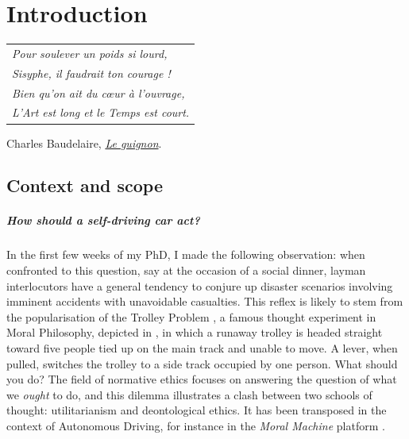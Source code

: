 
\graphicspath{{2-Chapters/1-Chapter/}}

\chapter{Introduction}
\label{chapter:1}

\begin{flushright}
	\begin{tabular}{@{}l@{}}
		\emph{Pour soulever un poids si lourd,}\\
		\emph{Sisyphe, il faudrait ton courage !}\\
		\emph{Bien qu’on ait du cœur à l’ouvrage,}\\
		\emph{L’Art est long et le Temps est court.}\\
	\end{tabular}

	Charles Baudelaire, \href{https://eleurent.github.io/sisyphe/texts/le-guignon.html}{\emph{Le guignon}}.
\end{flushright}

\section{Context and scope}


\paragraph{How should a self-driving car act?}

In the first few weeks of my PhD, I made the following observation: when confronted to this question, say at the occasion of a social dinner, layman interlocutors have a general tendency to conjure up disaster scenarios involving imminent accidents with unavoidable casualties. 
This reflex is likely to stem from the popularisation of the Trolley Problem \citep{Foot1967}, a famous thought experiment in Moral Philosophy, depicted in , in which a runaway trolley is headed straight toward five people tied up on the main track and unable to move. A lever, when pulled, switches the trolley to a side track occupied by one person. What should you do? The field of normative ethics focuses on answering the question of what we \emph{ought} to do, and this dilemma illustrates a clash between two schools of thought: utilitarianism and deontological ethics. 
It has been transposed in the context of Autonomous Driving, for instance in the \emph{Moral Machine} platform \citep{Awad2018}.

